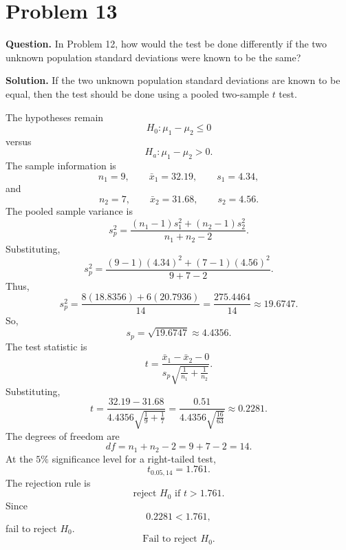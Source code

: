 \documentclass[11pt]{article}
\begin{document}
\section*{Problem 13}

\textbf{Question.} In Problem 12, how would the test be done differently if the two unknown population standard deviations were known to be the same?

\textbf{Solution.} If the two unknown population standard deviations are known to be equal, then the test should be done using a pooled two-sample $t$ test.

The hypotheses remain
\[
H_0:\mu_1-\mu_2\le 0
\]
versus
\[
H_a:\mu_1-\mu_2>0.
\]
The sample information is
\[
n_1=9,\qquad \bar x_1=32.19,\qquad s_1=4.34,
\]
and
\[
n_2=7,\qquad \bar x_2=31.68,\qquad s_2=4.56.
\]
The pooled sample variance is
\[
s_p^2=\frac{(n_1-1)s_1^2+(n_2-1)s_2^2}{n_1+n_2-2}.
\]
Substituting,
\[
s_p^2=\frac{(9-1)(4.34)^2+(7-1)(4.56)^2}{9+7-2}.
\]
Thus,
\[
s_p^2=\frac{8(18.8356)+6(20.7936)}{14}=\frac{275.4464}{14}\approx 19.6747.
\]
So,
\[
s_p=\sqrt{19.6747}\approx 4.4356.
\]
The test statistic is
\[
t=\frac{\bar x_1-\bar x_2-0}{s_p\sqrt{\frac{1}{n_1}+\frac{1}{n_2}}}.
\]
Substituting,
\[
t=\frac{32.19-31.68}{4.4356\sqrt{\frac{1}{9}+\frac{1}{7}}}
=\frac{0.51}{4.4356\sqrt{\frac{16}{63}}}\approx 0.2281.
\]
The degrees of freedom are
\[
df=n_1+n_2-2=9+7-2=14.
\]
At the $5\%$ significance level for a right-tailed test,
\[
t_{0.05,14}=1.761.
\]
The rejection rule is
\[
\text{reject }H_0\text{ if }t>1.761.
\]
Since
\[
0.2281<1.761,
\]
fail to reject $H_0$.
\[
\boxed{\text{Fail to reject }H_0.}
\]

\newpage
\end{document}
